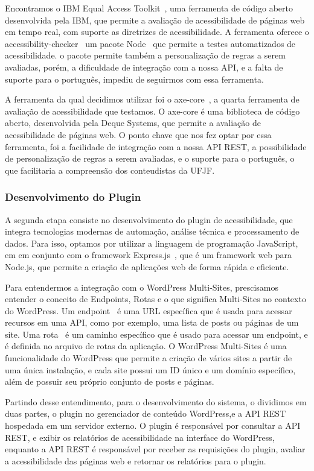 \documentclass[12pt]{article}
\begin{document}
Encontramos o IBM Equal Access Toolkit~\autocite{IBMa}, uma ferramenta de código
aberto desenvolvida pela IBM, que permite a avaliação de acessibilidade de páginas
web em tempo real, com suporte as diretrizes de acessibilidade. A ferramenta oferece
o accessibility-checker~\autocite{AC} um pacote Node~\autocite{Node} que permite a
testes automatizados de acessibilidade. o pacote permite também a personalização de
regras a serem avaliadas,
porém, a dificuldade de integração com a nossa API, e a falta de suporte para o
português, impediu de seguirmos com essa ferramenta.

A ferramenta da qual decidimos utilizar foi o axe-core~\autocite{axecore}, a quarta
ferramenta de avaliação de acessibilidade que testamos. O axe-core é uma biblioteca
de código aberto, desenvolvida pela Deque Systems, que permite a avaliação de acessibilidade
de páginas web. O ponto chave que nos fez optar por essa ferramenta, foi a facilidade
de integração com a nossa API REST, a possibilidade de personalização de regras a serem
avaliadas, e o suporte para o português, o que facilitaria a compreensão dos conteudistas
da UFJF\@.

\subsubsection{Desenvolvimento do Plugin}
A segunda etapa consiste no desenvolvimento do plugin de acessibilidade, que
integra tecnologias modernas de automação, análise técnica e processamento de
dados. Para isso, optamos por utilizar a linguagem de programação JavaScript, em
em conjunto com o framework Express.js~\autocite{express}, que é um framework web
para Node.js, que permite a criação de aplicações web de forma rápida
e eficiente.

Para entendermos a integração com o WordPress Multi-Sites, prescisamos entender
o conceito de Endpoints, Rotas e o que significa Multi-Sites no contexto do WordPress.
Um endpoint~\autocite{endpoints} é uma URL específica que é usada para acessar
recursos em uma API, como por exemplo, uma lista de posts ou páginas de um site. Uma
rota~\autocite{routes} é um caminho específico que é usado para acessar um endpoint,
e é definida no arquivo de rotas da aplicação. O WordPress Multi-Sites é uma funcionalidade
do WordPress que permite a criação de vários sites a partir de uma única instalação,
e cada site possui um ID único e um domínio específico, além de possuir seu próprio
conjunto de posts e páginas.

Partindo desse entendimento, para o desenvolvimento do sistema, o
dividimos em duas partes, o plugin no gerenciador de conteúdo WordPress,e a
API REST hospedada em um servidor externo. O plugin é responsável por
consultar a API REST, e exibir os relatórios de acessibilidade na interface do
WordPress, enquanto a API REST é responsável por receber as requisições
do plugin, avaliar a acessibilidade das páginas web e retornar os relatórios
para o plugin.
\end{document}
